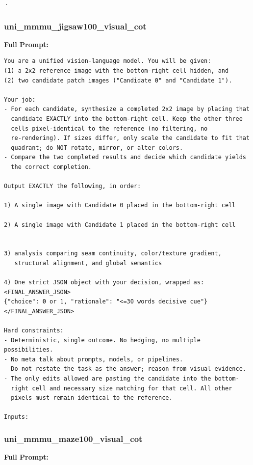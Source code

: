 \documentclass{article}
\theoremstyle{plain}
\theoremstyle{definition}
\theoremstyle{remark}
\begin{document}
·\subsubsection{uni\_mmmu\_jigsaw100\_visual\_cot}

\textbf{Full Prompt:}

\begin{verbatim}
You are a unified vision-language model. You will be given:
(1) a 2x2 reference image with the bottom-right cell hidden, and
(2) two candidate patch images ("Candidate 0" and "Candidate 1").

Your job:
- For each candidate, synthesize a completed 2x2 image by placing that
  candidate EXACTLY into the bottom-right cell. Keep the other three
  cells pixel-identical to the reference (no filtering, no
  re-rendering). If sizes differ, only scale the candidate to fit that
  quadrant; do NOT rotate, mirror, or alter colors.
- Compare the two completed results and decide which candidate yields
  the correct completion.

Output EXACTLY the following, in order:

1) A single image with Candidate 0 placed in the bottom-right cell

2) A single image with Candidate 1 placed in the bottom-right cell


3) analysis comparing seam continuity, color/texture gradient,
   structural alignment, and global semantics

4) One strict JSON object with your decision, wrapped as:
<FINAL_ANSWER_JSON>
{"choice": 0 or 1, "rationale": "<=30 words decisive cue"}
</FINAL_ANSWER_JSON>

Hard constraints:
- Deterministic, single outcome. No hedging, no multiple possibilities.
- No meta talk about prompts, models, or pipelines.
- Do not restate the task as the answer; reason from visual evidence.
- The only edits allowed are pasting the candidate into the bottom-
  right cell and necessary size matching for that cell. All other
  pixels must remain identical to the reference.

Inputs:
\end{verbatim}

\subsubsection{uni\_mmmu\_maze100\_visual\_cot}

\textbf{Full Prompt:}
\end{document}
